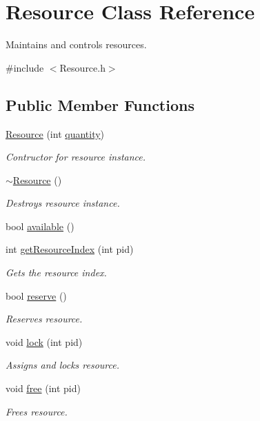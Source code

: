 \hypertarget{class_resource}{}\section{Resource Class Reference}
\label{class_resource}


Maintains and controls resources.  




{\ttfamily \#include $<$Resource.\+h$>$}

\subsection*{Public Member Functions}
\begin{DoxyCompactItemize}
\item 
\hyperlink{class_resource_aa66a88a5d14d251bead3660f7bcf1e37}{Resource} (int \hyperlink{class_resource_ad87427f8c53da8c83f4a00a2eef25f7f}{quantity})
\begin{DoxyCompactList}\small\item\em Contructor for resource instance. \end{DoxyCompactList}\item 
\hyperlink{class_resource_a0e5ec475e2601bdb33644468e86f6f10}{$\sim$\+Resource} ()
\begin{DoxyCompactList}\small\item\em Destroys resource instance. \end{DoxyCompactList}\item 
bool \hyperlink{class_resource_aeab97fd70f8ce65b0e883444642c3321}{available} ()
\item 
int \hyperlink{class_resource_a8d29438e770b809c58a646c0b527971b}{get\+Resource\+Index} (int pid)
\begin{DoxyCompactList}\small\item\em Gets the resource index. \end{DoxyCompactList}\item 
bool \hyperlink{class_resource_a269d0bd21401f93304f9b65837259444}{reserve} ()
\begin{DoxyCompactList}\small\item\em Reserves resource. \end{DoxyCompactList}\item 
void \hyperlink{class_resource_abbe4d6d7e9ee1fb34f53aede34acfdf4}{lock} (int pid)
\begin{DoxyCompactList}\small\item\em Assigns and locks resource. \end{DoxyCompactList}\item 
void \hyperlink{class_resource_a1b67c452867b328a40434ad1a94d0afd}{free} (int pid)
\begin{DoxyCompactList}\small\item\em Frees resource. \end{DoxyCompactList}\end{DoxyCompactItemize}
